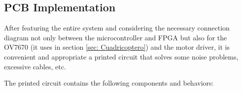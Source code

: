 

\subsection{PCB Implementation}\label{sec:PCB}

After featuring the entire system and considering the necessary connection diagram not only between the microcontroller and FPGA but also for the OV7670 (it uses in section \ref{sec: Cuadricoptero}) and the motor driver, it is convenient and appropriate a printed circuit that solves some noise problems, excessive cables, etc. \newline

The printed circuit contains the following components and behaviors:


